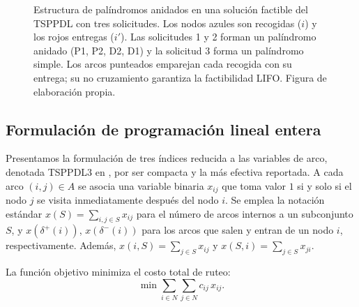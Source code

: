 \documentclass[conference]{IEEEtran}
\begin{document}
\begin{figure}[!t]
\centering
{}
\caption{Estructura de palíndromos anidados en una solución factible del TSPPDL con tres solicitudes. Los nodos azules son recogidas ($i$) y los rojos entregas ($i'$). Las solicitudes 1 y 2 forman un palíndromo anidado (P1, P2, D2, D1) y la solicitud 3 forma un palíndromo simple. Los arcos punteados emparejan cada recogida con su entrega; su no cruzamiento garantiza la factibilidad LIFO. Figura de elaboración propia.}
\label{fig:lifo}
\end{figure}

\subsection{Formulación de programación lineal entera}
Presentamos la formulación de tres índices reducida a las variables de arco, denotada TSPPDL3 en \cite{cordeau2010}, por ser compacta y la más efectiva reportada. A cada arco $(i,j)\in A$ se asocia una variable binaria $x_{ij}$ que toma valor $1$ si y solo si el nodo $j$ se visita inmediatamente después del nodo $i$. Se emplea la notación estándar $x(S)=\sum_{i,j\in S}x_{ij}$ para el número de arcos internos a un subconjunto $S$, y $x(\delta^{+}(i))$, $x(\delta^{-}(i))$ para los arcos que salen y entran de un nodo $i$, respectivamente. Además, $x(i,S)=\sum_{j\in S}x_{ij}$ y $x(S,i)=\sum_{j\in S}x_{ji}$.

La función objetivo minimiza el costo total de ruteo:
\begin{equation}
\min \sum_{i\in N}\sum_{j\in N} c_{ij}\,x_{ij}. \label{eq:obj}
\end{equation}
\end{document}
